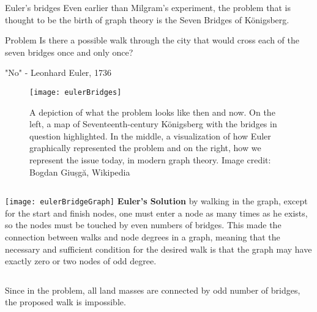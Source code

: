 \begin{frame}{Euler's bridges}
Even earlier than Milgram's experiment, the problem that is thought to be the birth of graph theory is the Seven Bridges of Königsberg.\par

\begin{block}{Problem}
Is there a possible walk through the city that would cross each of the seven bridges once and only once?\par 
"No" - Leonhard Euler, 1736
\end{block}

\begin{figure}[!h]
  \centering
  \texttt{[image: eulerBridges]}
  \caption{A depiction of what the problem looks like then and now. On the left, a map of Seventeenth-century Königsberg with the bridges in question highlighted. In the middle, a visualization of how Euler graphically represented the problem and on the right, how we represent the issue today, in modern graph theory. Image credit: Bogdan Giușgă, Wikipedia}
  \label{fig:eulerBridges}
\end{figure}
\end{frame}


\begin{frame}
\begin{columns}
             \centering
             \texttt{[image: eulerBridgeGraph]}
              \textbf{Euler's Solution}
by walking in the graph, except for the start and finish nodes, one must enter a node as many times as he exists, so the nodes must be touched by even numbers of bridges. This made the connection between walks and node degrees in a graph, meaning that the necessary and sufficient condition for the desired walk is that the graph may have exactly zero or two nodes of odd degree.
         \end{columns} 
         
\vspace{5mm}
         
Since in the problem, all land masses are connected by odd number of bridges, the proposed walk is impossible.\par 

\vspace{5mm}

\end{frame}


